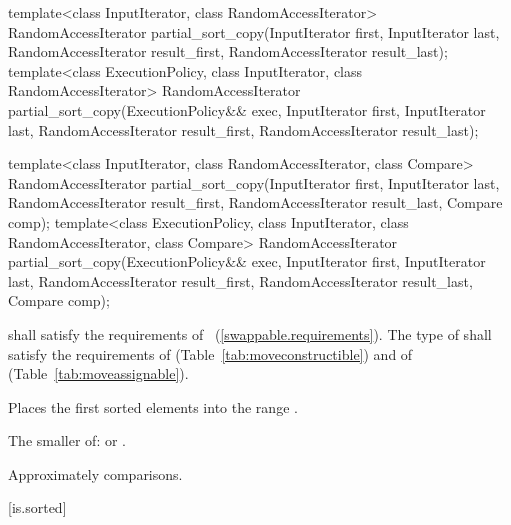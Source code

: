 %
\begin{itemdecl}
template<class InputIterator, class RandomAccessIterator>
  RandomAccessIterator
    partial_sort_copy(InputIterator first, InputIterator last,
                      RandomAccessIterator result_first,
                      RandomAccessIterator result_last);
template<class ExecutionPolicy, class InputIterator, class RandomAccessIterator>
  RandomAccessIterator
    partial_sort_copy(ExecutionPolicy&& exec,
                      InputIterator first, InputIterator last,
                      RandomAccessIterator result_first,
                      RandomAccessIterator result_last);

template<class InputIterator, class RandomAccessIterator,
         class Compare>
  RandomAccessIterator
    partial_sort_copy(InputIterator first, InputIterator last,
                      RandomAccessIterator result_first,
                      RandomAccessIterator result_last,
                      Compare comp);
template<class ExecutionPolicy, class InputIterator, class RandomAccessIterator,
         class Compare>
  RandomAccessIterator
    partial_sort_copy(ExecutionPolicy&& exec,
                      InputIterator first, InputIterator last,
                      RandomAccessIterator result_first,
                      RandomAccessIterator result_last,
                      Compare comp);
\end{itemdecl}

\begin{itemdescr}
\pnum
\requires
{} shall satisfy the requirements of
~(\ref{swappable.requirements}). The type
of  shall satisfy the requirements of
 (Table~\ref{tab:moveconstructible}) and of
 (Table~\ref{tab:moveassignable}).

\pnum
\effects
Places the first
sorted elements into the range
.

\pnum
\returns
The smaller of:
 or
.

\pnum
\complexity
Approximately
comparisons.
\end{itemdescr}

[is.sorted]{}

